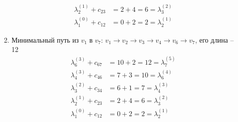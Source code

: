 \documentclass[a4paper, 12pt]{article}
\begin{document}
\begin{enumerate}
\begin{enumerate}[label*=\arabic*.]
\begin{align*}
                \lambda_2^{(1)} + c_{23} &= 2 + 4 = 6 = \lambda_3^{(2)} \\
                \lambda_1^{(0)} + c_{12} &= 0 + 2 = 2 = \lambda_2^{(1)}
            \end{align*}
            \newpage
            \item Минимальный путь из $v_1$ в $v_7$: $v_1 \rightarrow v_2 \rightarrow v_3 \rightarrow v_4 \rightarrow v_6 \rightarrow v_7$, его длина -- 12
            \begin{align*}
                \lambda_6^{(3)} + c_{67} &= 10 + 2 = 12 = \lambda_7^{(5)} \\
                \lambda_4^{(3)} + c_{46} &= 7 + 3 = 10 = \lambda_6^{(4)} \\
                \lambda_3^{(2)} + c_{34} &= 6 + 1 = 7 = \lambda_4^{(3)} \\
                \lambda_2^{(1)} + c_{23} &= 2 + 4 = 6 = \lambda_3^{(2)} \\
                \lambda_1^{(0)} + c_{12} &= 0 + 2 = 2 = \lambda_2^{(1)}
            \end{align*}
        \end{enumerate}
    \end{enumerate}
\end{document}
